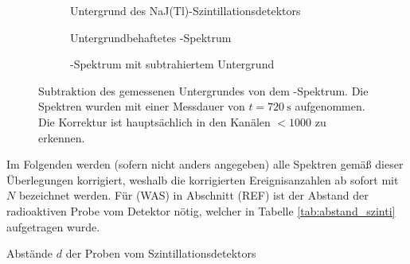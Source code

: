 \documentclass[11pt, a4paper]{article}
\numberwithin{equation}{section}
\begin{document}
\begin{figure}[hp]
	\centering
	\begin{subfigure}[b]{0.65\textwidth}
		\resizebox{!}{0.285\textheight}{
		
		}
		\caption{Untergrund des NaJ(Tl)-Szintillationsdetektors}
		\label{fig:untergrund_szinti}
	\end{subfigure}
	
	\begin{subfigure}[b]{0.65\textwidth}
		\resizebox{!}{0.285\textheight}{
		
		}
		\caption{Untergrundbehaftetes -Spektrum}
		\label{fig:cobalt_mit_untergrund}
	\end{subfigure}
	
	\begin{subfigure}[b]{0.65\textwidth}
		\resizebox{!}{0.285\textheight}{
		
		}
		\caption{-Spektrum mit subtrahiertem Untergrund}
		\label{fig:cobalt_ohne_untergrund}
	\end{subfigure}
	\caption{Subtraktion des gemessenen Untergrundes von dem -Spektrum. Die Spektren wurden mit einer Messdauer von $t = \SI{720}{\second}$ aufgenommen. Die Korrektur ist hauptsächlich in den Kanälen $< 1000$ zu erkennen.}
	\label{fig:abzug_untergrund}
\end{figure}
Im Folgenden werden (sofern nicht anders angegeben) alle Spektren gemäß dieser Überlegungen korrigiert, weshalb die korrigierten Ereignisanzahlen ab sofort mit $N$ bezeichnet werden.
Für (WAS) in Abschnitt (REF) ist der Abstand der radioaktiven Probe vom Detektor nötig, welcher in Tabelle \ref{tab:abstand_szinti} aufgetragen wurde.
\begin{table}[h]
	\centering
	
	\caption{Abstände $d$ der Proben vom Szintillationsdetektors}
	\label{tab:abstand_szinti}
\end{table}
\end{document}
